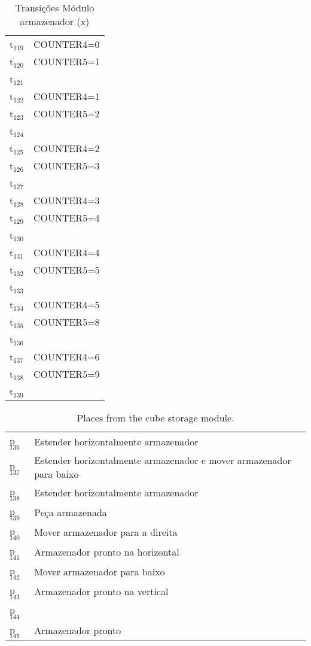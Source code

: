 \begin{table}[htbp]
\caption{Transições Módulo armazenador (x)}
\centering
\begin{tabular}{ll}
t\(_{\text{119}}\) & COUNTER4=0\\
t\(_{\text{120}}\) & COUNTER5=1\\
t\(_{\text{121}}\) & \\
t\(_{\text{122}}\) & COUNTER4=1\\
t\(_{\text{123}}\) & COUNTER5=2\\
t\(_{\text{124}}\) & \\
t\(_{\text{125}}\) & COUNTER4=2\\
t\(_{\text{126}}\) & COUNTER5=3\\
t\(_{\text{127}}\) & \\
t\(_{\text{128}}\) & COUNTER4=3\\
t\(_{\text{129}}\) & COUNTER5=4\\
t\(_{\text{130}}\) & \\
t\(_{\text{131}}\) & COUNTER4=4\\
t\(_{\text{132}}\) & COUNTER5=5\\
t\(_{\text{133}}\) & \\
t\(_{\text{134}}\) & COUNTER4=5\\
t\(_{\text{135}}\) & COUNTER5=8\\
t\(_{\text{136}}\) & \\
t\(_{\text{137}}\) & COUNTER4=6\\
t\(_{\text{138}}\) & COUNTER5=9\\
t\(_{\text{139}}\) & \\
\end{tabular}
\end{table}
\begin{table}[htbp]
\caption{Places from the cube storage module.}
\centering
\begin{tabular}{ll}
p\(_{\text{136}}\) & Estender horizontalmente armazenador\\
p\(_{\text{137}}\) & Estender horizontalmente armazenador e mover armazenador para baixo\\
p\(_{\text{138}}\) & Estender horizontalmente armazenador\\
p\(_{\text{139}}\) & Peça armazenada\\
p\(_{\text{140}}\) & Mover armazenador para a direita\\
p\(_{\text{141}}\) & Armazenador pronto na horizontal\\
p\(_{\text{142}}\) & Mover armazenador para baixo\\
p\(_{\text{143}}\) & Armazenador pronto na vertical\\
p\(_{\text{144}}\) & \\
p\(_{\text{145}}\) & Armazenador pronto\\
\end{tabular}
\end{table}

